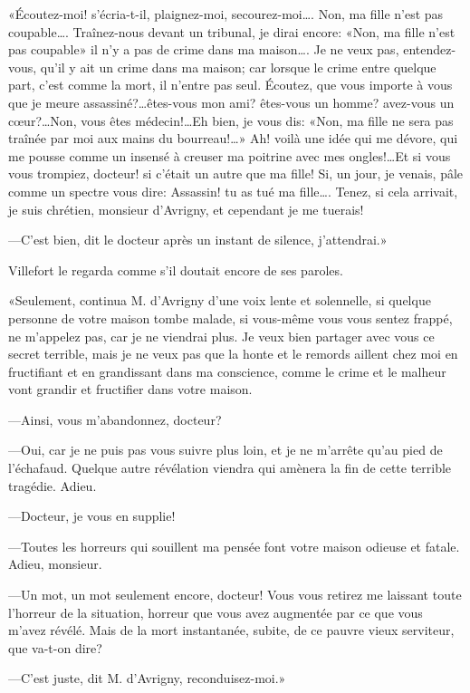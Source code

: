 «Écoutez-moi! s'écria-t-il, plaignez-moi, secourez-moi\dots. Non, ma fille n'est pas coupable\dots. Traînez-nous devant un tribunal, je dirai encore: «Non, ma fille n'est pas coupable» il n'y a pas de crime dans ma maison\dots. Je ne veux pas, entendez-vous, qu'il y ait un crime dans ma maison; car lorsque le crime entre quelque part, c'est comme la mort, il n'entre pas seul. Écoutez, que vous importe à vous que je meure assassiné?\dots êtes-vous mon ami? êtes-vous un homme? avez-vous un cœur?\dots Non, vous êtes médecin!\dots Eh bien, je vous dis: «Non, ma fille ne sera pas traînée par moi aux mains du bourreau!\dots» Ah! voilà une idée qui me dévore, qui me pousse comme un insensé à creuser ma poitrine avec mes ongles!\dots Et si vous vous trompiez, docteur! si c'était un autre que ma fille! Si, un jour, je venais, pâle comme un spectre vous dire: Assassin! tu as tué ma fille\dots. Tenez, si cela arrivait, je suis chrétien, monsieur d'Avrigny, et cependant je me tuerais! 

—C'est bien, dit le docteur après un instant de silence, j'attendrai.» 

Villefort le regarda comme s'il doutait encore de ses paroles. 

«Seulement, continua M. d'Avrigny d'une voix lente et solennelle, si quelque personne de votre maison tombe malade, si vous-même vous vous sentez frappé, ne m'appelez pas, car je ne viendrai plus. Je veux bien partager avec vous ce secret terrible, mais je ne veux pas que la honte et le remords aillent chez moi en fructifiant et en grandissant dans ma conscience, comme le crime et le malheur vont grandir et fructifier dans votre maison. 

—Ainsi, vous m'abandonnez, docteur? 

—Oui, car je ne puis pas vous suivre plus loin, et je ne m'arrête qu'au pied de l'échafaud. Quelque autre révélation viendra qui amènera la fin de cette terrible tragédie. Adieu. 

—Docteur, je vous en supplie! 

—Toutes les horreurs qui souillent ma pensée font votre maison odieuse et fatale. Adieu, monsieur. 

—Un mot, un mot seulement encore, docteur! Vous vous retirez me laissant toute l'horreur de la situation, horreur que vous avez augmentée par ce que vous m'avez révélé. Mais de la mort instantanée, subite, de ce pauvre vieux serviteur, que va-t-on dire? 

—C'est juste, dit M. d'Avrigny, reconduisez-moi.» 

